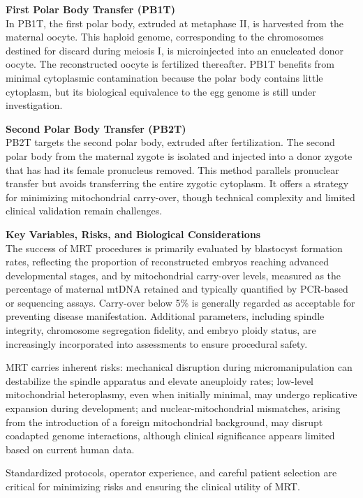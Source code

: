 \begin{technical}
\vspace{0.4em}

\textbf{First Polar Body Transfer (PB1T)}\\
In PB1T, the first polar body, extruded at metaphase II, is harvested from the maternal oocyte. This haploid genome, corresponding to the chromosomes destined for discard during meiosis I, is microinjected into an enucleated donor oocyte. The reconstructed oocyte is fertilized thereafter. PB1T benefits from minimal cytoplasmic contamination because the polar body contains little cytoplasm, but its biological equivalence to the egg genome is still under investigation.

\vspace{0.4em}

\textbf{Second Polar Body Transfer (PB2T)}\\
PB2T targets the second polar body, extruded after fertilization. The second polar body from the maternal zygote is isolated and injected into a donor zygote that has had its female pronucleus removed. This method parallels pronuclear transfer but avoids transferring the entire zygotic cytoplasm. It offers a strategy for minimizing mitochondrial carry-over, though technical complexity and limited clinical validation remain challenges.

\vspace{0.4em}

\textbf{Key Variables, Risks, and Biological Considerations}\\
The success of MRT procedures is primarily evaluated by blastocyst formation rates, reflecting the proportion of reconstructed embryos reaching advanced developmental stages, and by mitochondrial carry-over levels, measured as the percentage of maternal mtDNA retained and typically quantified by PCR-based or sequencing assays. Carry-over below 5\% is generally regarded as acceptable for preventing disease manifestation. Additional parameters, including spindle integrity, chromosome segregation fidelity, and embryo ploidy status, are increasingly incorporated into assessments to ensure procedural safety. 

MRT carries inherent risks: mechanical disruption during micromanipulation can destabilize the spindle apparatus and elevate aneuploidy rates; low-level mitochondrial heteroplasmy, even when initially minimal, may undergo replicative expansion during development; and nuclear-mitochondrial mismatches, arising from the introduction of a foreign mitochondrial background, may disrupt coadapted genome interactions, although clinical significance appears limited based on current human data.

Standardized protocols, operator experience, and careful patient selection are critical for minimizing risks and ensuring the clinical utility of MRT.
\end{technical}

